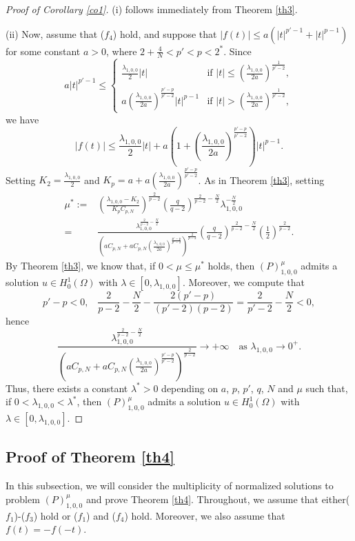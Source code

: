 \documentclass[11pt]{amsart}
\newcommand{\abs}[1]{\lvert#1\rvert}
\numberwithin{equation}{section}
\begin{document}
\begin{proof}[Proof of Corollary \ref{co1}]
(i) follows immediately from Theorem \ref{th3}.

(ii) Now, assume that ($f_4$) hold, and suppose that $|f(t)|\leq a\left(\abs{t}^{p'-1} +\abs{t}^{p-1}\right)$  for some constant $a>0$, where $2+\frac{4}{N}<p'<p<2^*$. Since
$$
a\abs{t}^{p'-1}\leq \begin{cases}
    \frac{\lambda_{1,0,0}}{2}\abs{t}\quad &\text{if }\abs{t}\leq \left(\frac{\lambda_{1,0,0}}{2a}\right)^\frac{1}{p'-2},\\
    a\left(\frac{\lambda_{1,0,0}}{2a}\right)^\frac{p'-p}{p'-2}\abs{t}^{p-1} &\text{if }\abs{t}> \left(\frac{\lambda_{1,0,0}}{2a}\right)^\frac{1}{p'-2},
\end{cases}
$$
we have
    $$
        |f(t)|\leq \frac{\lambda_{1,0,0}}{2}\abs{t} +a\left(1+\left(\frac{\lambda_{1,0,0}}{2a}\right)^\frac{p'-p}{p'-2}\right)\abs{t}^{p-1}.
    $$
   Setting $K_2 =\frac{\lambda_{1,0,0}}{2}$ and $K_p=a+a\left(\frac{\lambda_{1,0,0}}{2a}\right)^\frac{p'-p}{p'-2}$. As in Theorem \ref{th3}, setting
$$
\begin{aligned}
\mu^*:=&\left(\frac{\lambda_{1,0,0}-K_2}{K_pC_{p,N}}\right)^{\frac{2}{p-2}}\left(\frac{q}{q-2}\right)^{{\frac{2}{p-2}}-\frac{N}{2}}\lambda_{1,0,0}^{-\frac{N}{2}}\\
=&\frac{\lambda_{1,0,0}^{{\frac{2}{p-2}}-\frac{N}{2}}}{\left(aC_{p,N}+aC_{p,N}\left(\frac{\lambda_{1,0,0}}{2a}\right)^\frac{p'-p}{p'-2}\right)^\frac{2}{p-2}}\left(\frac{q}{q-2}\right)^{\frac{2}{p-2}-\frac{N}{2}}\left(\frac{1}{2}\right)^{\frac{2}{p-2}}.
\end{aligned}
$$  By Theorem \ref{th3}, we know that, if  $0<\mu \leq \mu^*$ holds,
   then $(P)^{\mu}_{1,0,0}$ admits a solution $u \in H^1_0(\Omega)$ with $\lambda \in [0, \lambda_{1,0,0}]$. Moreover, we compute that
   $$
   p'-p<0,\,\,\,\,\,\frac{2}{p-2}-\frac{N}{2}-\frac{2(p'-p)}{(p'-2)(p-2)}=\frac{2}{p'-2}-\frac{N}{2}<0,
   $$
   hence
   $$
   \frac{\lambda_{1,0,0}^{{\frac{2}{p-2}}-\frac{N}{2}}}{\left(aC_{p,N}+aC_{p,N}\left(\frac{\lambda_{1,0,0}}{2a}\right)^\frac{p'-p}{p'-2}\right)^\frac{2}{p-2}}\to +\infty \quad \text{as }\lambda_{1,0,0} \to 0^+.
   $$
   Thus, there exists a constant $\lambda^*>0$ depending on $a$, $p$, $p'$, $q$, $N$ and $\mu$ such that, if $0<\lambda_{1,0,0}<\lambda^*$, then $(P)^{\mu}_{1,0,0}$ admits a solution $u \in H^1_0(\Omega)$ with $\lambda \in [0, \lambda_{1,0,0}]$.
\end{proof}
\subsection{Proof of Theorem \ref{th4}}\label{secp4}
In this subsection, we will consider the multiplicity of normalized solutions to problem $(P)^{\mu}_{1,0,0}$ and prove Theorem \ref{th4}. Throughout, we assume that either($f_1$)-($f_3$) hold or ($f_1$) and ($f_4$) hold. Moreover, we also assume that $f(t)=-f(-t)$.
\end{document}

